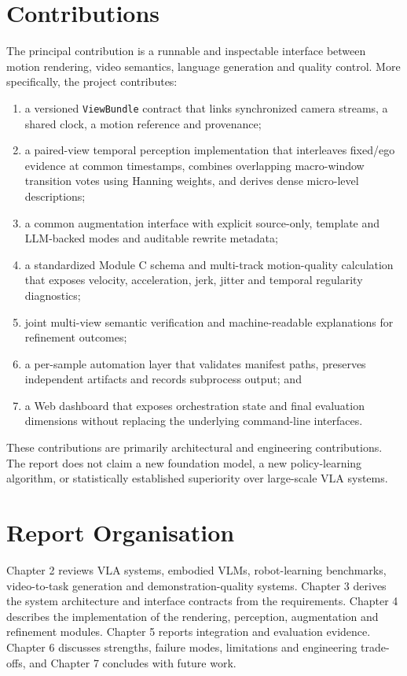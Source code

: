 \documentclass[11pt,oneside]{report}
\begin{document}
\section{Contributions}
The principal contribution is a runnable and inspectable interface between
motion rendering, video semantics, language generation and quality control.
More specifically, the project contributes:

\begin{enumerate}
    \item a versioned \texttt{ViewBundle} contract that links synchronized
    camera streams, a shared clock, a motion reference and provenance;
    \item a paired-view temporal perception implementation that interleaves
    fixed/ego evidence at common timestamps, combines overlapping macro-window
    transition votes using Hanning weights, and derives dense micro-level
    descriptions;
    \item a common augmentation interface with explicit source-only, template
    and LLM-backed modes and auditable rewrite metadata;
    \item a standardized Module C schema and multi-track motion-quality
    calculation that exposes velocity, acceleration, jerk, jitter and temporal
    regularity diagnostics;
    \item joint multi-view semantic verification and machine-readable
    explanations for refinement outcomes;
    \item a per-sample automation layer that validates manifest paths, preserves
    independent artifacts and records subprocess output; and
    \item a Web dashboard that exposes orchestration state and final evaluation
    dimensions without replacing the underlying command-line interfaces.
\end{enumerate}

These contributions are primarily architectural and engineering contributions.
The report does not claim a new foundation model, a new policy-learning
algorithm, or statistically established superiority over large-scale VLA
systems.

\section{Report Organisation}
Chapter 2 reviews VLA systems, embodied VLMs, robot-learning benchmarks,
video-to-task generation and demonstration-quality systems. Chapter 3 derives
the system architecture and interface contracts from the requirements.
Chapter 4 describes the implementation of the rendering, perception,
augmentation and refinement modules. Chapter 5 reports integration and
evaluation evidence. Chapter 6 discusses strengths, failure modes, limitations
and engineering trade-offs, and Chapter 7 concludes with future work.
\end{document}
